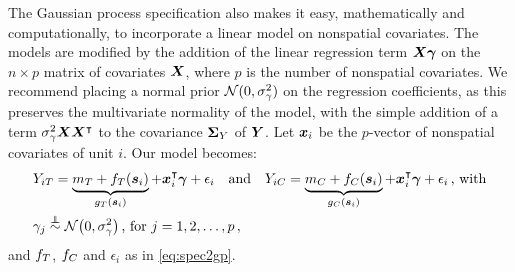\documentclass{article}
\begin{document}
The Gaussian process specification also makes it easy, mathematically and computationally, to incorporate a linear model on nonspatial covariates.
The models are modified by the addition of the linear regression term \(\bm{X} \bm{\gamma}\) on the \(n \times p\) matrix of covariates \(\bm{X}\), where \(p\) is the number of nonspatial covariates.
We recommend placing a normal prior \(\operatorname{\mathcal{N}}(0,\sigma_{\gamma}^2)\) on the regression coefficients, as this preserves the multivariate normality of the model, with the simple addition of a term \(\sigma_{\gamma}^2 \bm{X} \bm{X}^{\intercal}\) to the covariance \(\bm{\Sigma}_Y\) of \(\bm{Y}\).
Let \(\bm{x}_i\) be the \(p\)-vector of nonspatial covariates of unit \(i\).
Our model becomes:
\begin{equation}
    \begin{split}
        & Y_{i\treat} = \underbrace{m_\treat{} + f_\treat{}(\svec_i)}_{g_\treat{}(\svec_i)} + \xvec_i\trans \gammavec + \epsilon_i \quad\text{and}\quad
        Y_{i\ctrol} = \underbrace{m_\ctrol{} + f_\ctrol{}(\svec_i)}_{g_\ctrol{}(\svec_i)} + \xvec_i\trans \gammavec + \epsilon_i \,\text{, with} \\
        & \gamma_j \overset{\indep}{\sim} \normal\del{0,\sigmabeta^2}\,\text{, for }j=1,2,\dotsc,p \,,
    \end{split}
    \label{eq:covariates_model}
\end{equation}
and \(f_T\), \(f_C\) and \(\epsilon_i\) as in \autoref{eq:spec2gp}.
\end{document}
